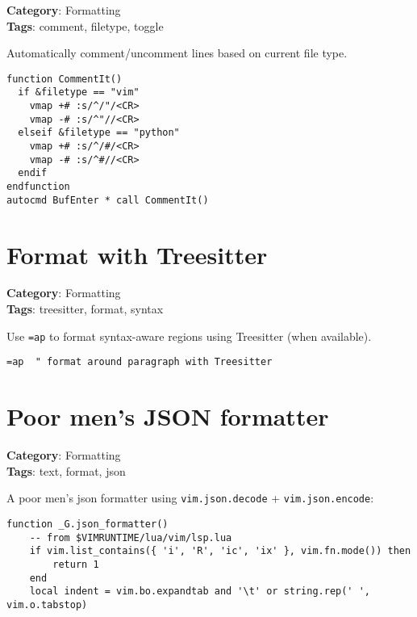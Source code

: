 {{{{{{\textbf{Category}: Formatting\\ \textbf{Tags}: comment, filetype, toggle
\vspace{0.5cm}

Automatically comment/uncomment lines based on current file type.

\begin{Exa*}{}
\begin{Verbatim}[fontsize=\footnotesize, breaklines, breakanywhere]
function CommentIt()
  if &filetype == "vim"
    vmap +# :s/^/"/<CR>
    vmap -# :s/^"//<CR>
  elseif &filetype == "python"
    vmap +# :s/^/#/<CR>
    vmap -# :s/^#//<CR>
  endif
endfunction
autocmd BufEnter * call CommentIt()
\end{Verbatim}
\end{Exa*}

\section{Format with Treesitter}

\textbf{Category}: Formatting\\ \textbf{Tags}: treesitter, format, syntax
\vspace{0.5cm}

Use {\footnotesize \Verb§=ap§} to format syntax-aware regions using Treesitter (when available).

\begin{Exa*}{}
\begin{Verbatim}[fontsize=\footnotesize, breaklines, breakanywhere]
=ap  " format around paragraph with Treesitter
\end{Verbatim}
\end{Exa*}

\section{Poor men's JSON formatter}

\textbf{Category}: Formatting\\ \textbf{Tags}: text, format, json
\vspace{0.5cm}

A poor men's json formatter using {\footnotesize \Verb§vim.json.decode§} + {\footnotesize \Verb§vim.json.encode§}:

\begin{Exa*}{}
\begin{Verbatim}[fontsize=\footnotesize, breaklines, breakanywhere]
function _G.json_formatter()
	-- from $VIMRUNTIME/lua/vim/lsp.lua
	if vim.list_contains({ 'i', 'R', 'ic', 'ix' }, vim.fn.mode()) then
		return 1
	end
	local indent = vim.bo.expandtab and '\t' or string.rep(' ', vim.o.tabstop)


\end{Verbatim}
\end{Exa*}}}}}}}
